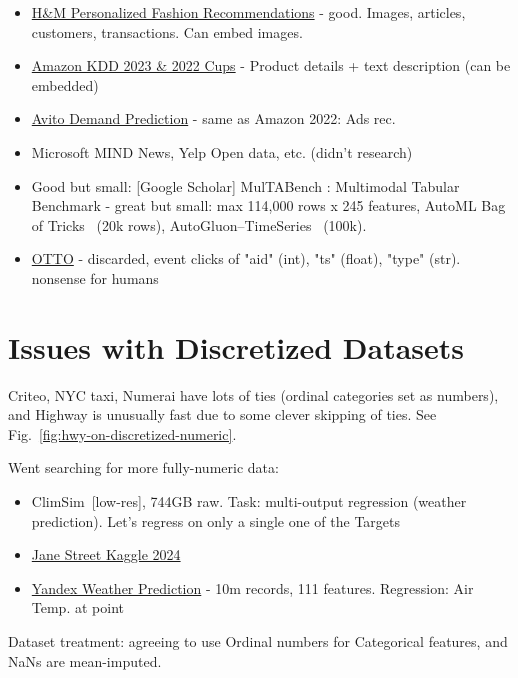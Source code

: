 \documentclass[11pt]{article}
\begin{document}
\begin{itemize}
    \item \href{https://www.kaggle.com/competitions/h-and-m-personalized-fashion-recommendations/data}{H\&M Personalized Fashion Recommendations} - good. Images, articles, customers, transactions. Can embed images.
    \item \href{https://www.aicrowd.com/challenges/amazon-kdd-cup-23-multilingual-recommendation-challenge}{Amazon KDD 2023 \& 2022 Cups} - Product details + text description (can be embedded)
    \item \href{https://www.kaggle.com/competitions/avito-demand-prediction/data}{Avito Demand Prediction} - same as Amazon 2022: Ads rec.
    \item Microsoft MIND News, Yelp Open data, etc. (didn't research)
    \item Good but small: [Google Scholar] MulTABench \cite{arazi_multabench_2026}: Multimodal Tabular Benchmark - great but small: max 114,000 rows x 245 features, AutoML Bag of Tricks~\cite{tang_bag_2024} (20k rows), AutoGluon–TimeSeries~\cite{shchur_autogluon-timeseries_2023} (100k).
    \item {\color{gray}\href{https://www.kaggle.com/competitions/otto-recommender-system}{OTTO} - discarded, event clicks of "aid" (int), "ts" (float), "type" (str). nonsense for humans }
\end{itemize}


\section{Issues with Discretized Datasets}

Criteo, NYC taxi, Numerai have lots of ties (ordinal categories set as numbers), and Highway is unusually fast due to some clever skipping of ties. See Fig.~\ref{fig:hwy-on-discretized-numeric}.


Went searching for more fully-numeric data:

\begin{itemize}
    \item ClimSim~\cite{yu2023climsim}[low-res], 744GB raw. Task: multi-output regression (weather prediction). Let's regress on only a single one of the Targets
    \item \href{https://www.kaggle.com/competitions/jane-street-real-time-market-data-forecasting/data}{Jane Street Kaggle 2024}
    \item \href{https://research.yandex.com/shifts/weather}{Yandex Weather Prediction} - 10m records, 111 features. Regression: Air Temp. at point
\end{itemize}



\appendix

Dataset treatment: agreeing to use Ordinal numbers for Categorical features, and NaNs are mean-imputed.



\end{document}
